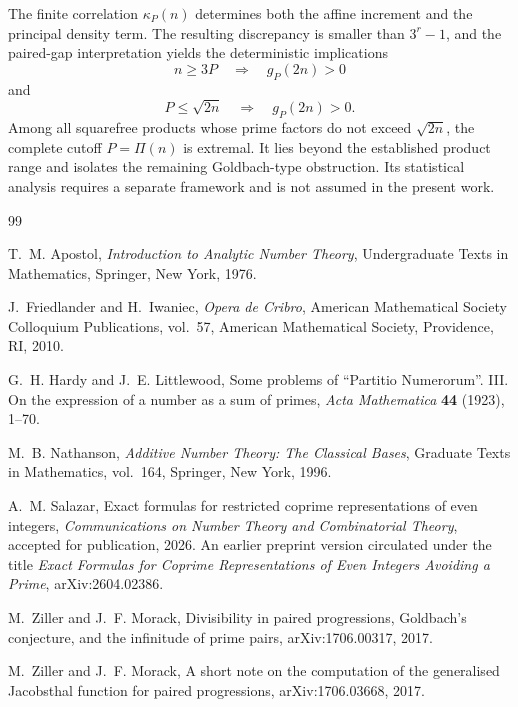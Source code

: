 \documentclass[12pt]{article}
\numberwithin{equation}{section}
\theoremstyle{definition}
\theoremstyle{remark}
\begin{document}
The finite correlation $\kappa_P(n)$ determines both the affine
increment and the principal density term. The resulting
discrepancy is smaller than $3^r-1$, and the paired-gap
interpretation yields the deterministic implications
\[
n\geq3P
\quad\Longrightarrow\quad
g_P(2n)>0
\]
and
\[
P\leq\sqrt{2n}
\quad\Longrightarrow\quad
g_P(2n)>0.
\]
Among all squarefree products whose prime factors do not exceed
$\sqrt{2n}$, the complete cutoff $P=\Pi(n)$ is extremal. It lies
beyond the established product range and isolates the remaining
Goldbach-type obstruction. Its statistical analysis requires a
separate framework and is not assumed in the present work.

\begin{thebibliography}{99}

T.~M. Apostol,
\emph{Introduction to Analytic Number Theory},
Undergraduate Texts in Mathematics,
Springer, New York, 1976.

J.~Friedlander and H.~Iwaniec,
\emph{Opera de Cribro},
American Mathematical Society Colloquium Publications,
vol.~57,
American Mathematical Society,
Providence, RI, 2010.

G.~H. Hardy and J.~E. Littlewood,
Some problems of ``Partitio Numerorum''.
III. On the expression of a number as a sum of primes,
\emph{Acta Mathematica}
\textbf{44} (1923), 1--70.

M.~B. Nathanson,
\emph{Additive Number Theory:
The Classical Bases},
Graduate Texts in Mathematics,
vol.~164,
Springer, New York, 1996.

A.~M. Salazar,
Exact formulas for restricted coprime representations of even
integers,
\emph{Communications on Number Theory and Combinatorial Theory},
accepted for publication, 2026.
An earlier preprint version circulated under the title
\emph{Exact Formulas for Coprime Representations of Even
Integers Avoiding a Prime},
arXiv:2604.02386.

M.~Ziller and J.~F. Morack,
Divisibility in paired progressions, Goldbach's conjecture,
and the infinitude of prime pairs,
arXiv:1706.00317, 2017.

M.~Ziller and J.~F. Morack,
A short note on the computation of the generalised Jacobsthal
function for paired progressions,
arXiv:1706.03668, 2017.

\end{thebibliography}
\end{document}
